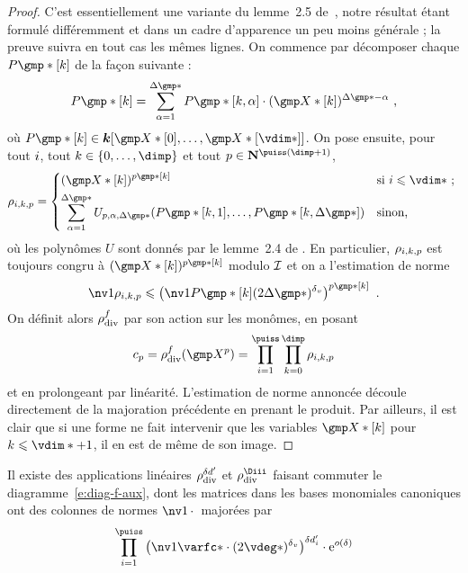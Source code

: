 \begin{proof}
  C'est essentiellement une variante du lemme~2.5 de~\cite{remivg}, notre
  résultat étant formulé différemment et dans un cadre d'apparence un peu
  moins générale ; la preuve suivra en tout cas les mêmes lignes. On commence
  par décomposer chaque \( P\mexp*[\ind] \) de la façon suivante :
  \begin{equation}
    P\mexp*[\ind]
    =
    \sum _{\alpha=1}^{\Delta\mexp*}
    P\mexp*[\ind, \alpha] \cdot (\vmp*[\ind])^{\Delta\mexp* - \alpha}
    \pmm,
  \end{equation}
  où \( P\mexp*[\ind] \in \cdn [ \vmp*[0], \dots, \vmp*[\vdim*] ] \).
  On pose ensuite, pour tout \( i \), tout
  \( \ind \in \{ 0, \dots, \dimp \} \) et tout
  \( p \in \N^{\puiss(\dimp+1)} \),
  \begin{equation}
    \rho_{\fct, \ind, p}
    =
    \begin{dcases*}
      ( \vmp*[\ind] ) ^{p\mexp*[\ind]}
      & si \( \fct \le \vdim* \) ;
      \\
      \sum _{\alpha=1}^{\Delta\mexp*}
      U_{p, \alpha, \Delta\mexp*}
      ( P\mexp*[\ind, 1], \dots, P\mexp*[\ind, \Delta\mexp*] )
      & sinon,
    \end{dcases*}
  \end{equation}
  où les polynômes \( U \) sont donnés par le lemme~2.4 de \cite{remivg}. En
  particulier, \( \rho_{i, k, p} \) est toujours congru à
  \( ( \vmp*[\ind] ) ^{p\mexp*[\ind]} \) modulo \( \mathcal I \) et on a
  l'estimation de norme
  \begin{equation}
    \nv1{ \rho_{\fct, \ind, p} }
    \le
    \left(
    \nv1{ P\mexp*[\ind] } (2\Delta\mexp*)^\dv
    \right) ^{p\mexp*[\ind]}
    \pmm.
  \end{equation}
  On définit alors \( \rho\sb{\mathrm{div }}^f \) par son action sur les monômes, en posant
  \begin{equation}
    c_p
    = \rdiv^f(\vmp^p)
    = \prod\fctrange \prod\indrange \rho_{\fct, \ind, p}
  \end{equation}
  et en prolongeant par linéarité. L'estimation de norme annoncée découle
  directement de la majoration précédente en prenant le produit. Par ailleurs,
  il est clair que si une forme ne fait intervenir que les variables \(
  \vmp*[\ind] \) pour \( \ind \le \vdim* + 1 \), il en est de même de son
  image.
\end{proof}

\begin{coro} \label{c:hmat-rdiv}
  Il existe des applications linéaires \( \rho\sb{\mathrm{div }}^{\delta d'} \) et \( \rdiv^\Diii \)
  faisant commuter le diagramme~\eqref{e:diag-f-aux}, dont les matrices dans
  les bases monomiales canoniques ont des colonnes de normes \( \nv1\truc \)
  majorées par
  \begin{equation}
    \prod\fctrange \left(
    \nv1{ \varfc* }
    \cdot ( 2 \vdeg* )^\dv
    \right) ^{ \delta d'_\fct }
    \cdot \expb^{ o(\delta) }
  \end{equation}
\end{coro}

